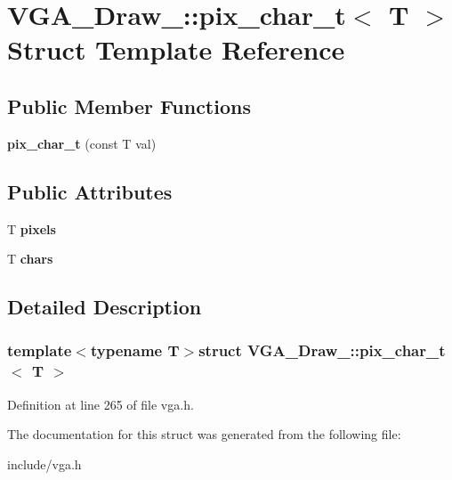 \hypertarget{structVGA__Draw__2_1_1pix__char__t}{\section{V\-G\-A\-\_\-\-Draw\-\_\-:\-:pix\-\_\-char\-\_\-t$<$ T $>$ Struct Template Reference}
\label{structVGA__Draw__2_1_1pix__char__t}
}
\subsection*{Public Member Functions}
\begin{DoxyCompactItemize}
\item 
\hypertarget{structVGA__Draw__2_1_1pix__char__t_ad7915d637ad651d51365acad00dda7b8}{{\bfseries pix\-\_\-char\-\_\-t} (const T val)}\label{structVGA__Draw__2_1_1pix__char__t_ad7915d637ad651d51365acad00dda7b8}

\end{DoxyCompactItemize}
\subsection*{Public Attributes}
\begin{DoxyCompactItemize}
\item 
\hypertarget{structVGA__Draw__2_1_1pix__char__t_af1d998ad1364f3ca2f30fbf58710c543}{T {\bfseries pixels}}\label{structVGA__Draw__2_1_1pix__char__t_af1d998ad1364f3ca2f30fbf58710c543}

\item 
\hypertarget{structVGA__Draw__2_1_1pix__char__t_adadece47feef5e31efb823d569aa451b}{T {\bfseries chars}}\label{structVGA__Draw__2_1_1pix__char__t_adadece47feef5e31efb823d569aa451b}

\end{DoxyCompactItemize}


\subsection{Detailed Description}
\subsubsection*{template$<$typename T$>$struct V\-G\-A\-\_\-\-Draw\-\_\-::pix\-\_\-char\-\_\-t$<$ T $>$}



Definition at line 265 of file vga.\-h.



The documentation for this struct was generated from the following file\-:\begin{DoxyCompactItemize}
\item 
include/vga.\-h\end{DoxyCompactItemize}
